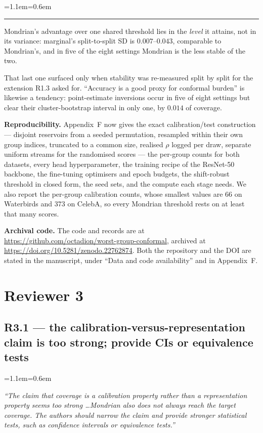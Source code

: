 \documentclass[11pt,a4paper]{article}
\newenvironment{reviewer}
  {\begin{list}{}{\leftmargin=1.1em\rightmargin=0.6em}\item[]\itshape\color{revgrey}\small}
  {\end{list}}
\newenvironment{revised}
  {\begin{list}{}{\leftmargin=1.1em\rightmargin=0.6em}\item[]%
   \color{black}\small\hspace{-1.1em}\textcolor{quoterule}{\rule[-0.4ex]{2pt}{1.05em}}\hspace{0.5em}\ignorespaces}
  {\end{list}}
\newcommand{\rpoint}[2]{\subsection*{#1 --- #2}}
\begin{document}
\begin{revised}
Mondrian's advantage over one shared threshold lies in the \emph{level} it attains, not
in its variance: marginal's split-to-split SD is $0.007$--$0.043$, comparable to Mondrian's, and in
five of the eight settings Mondrian is the less stable of the two.
\end{revised}

That last one surfaced only when stability was re-measured split by split for the extension R1.3
asked for. ``Accuracy is a good proxy for conformal burden'' is
likewise a tendency: point-estimate inversions occur in five of eight settings but clear their
cluster-bootstrap interval in only one, by $0.014$ of coverage.

\textbf{Reproducibility.} Appendix~F now gives the exact calibration/test construction --- disjoint
reservoirs from a seeded permutation, resampled within their own group indices, truncated to a
common size, realised $\rho$ logged per draw, separate uniform streams for the randomised scores ---
the per-group counts for both datasets, every head hyperparameter, the training recipe of the
ResNet-50 backbone, the fine-tuning optimisers and epoch budgets, the shift-robust threshold in
closed form, the seed sets, and the compute each stage needs. We
also report the per-group calibration counts, whose smallest values are $66$ on Waterbirds and
$373$ on CelebA, so every Mondrian threshold rests on at least that many scores.

\textbf{Archival code.} The code and records are at
\url{https://github.com/octadion/worst-group-conformal}, archived at
\url{https://doi.org/10.5281/zenodo.22762874}. Both the repository and the DOI are stated in
the manuscript, under ``Data and code availability'' and in Appendix~F.

\section*{Reviewer 3}

\rpoint{R3.1}{the calibration-versus-representation claim is too strong; provide CIs or equivalence
tests}

\begin{reviewer}
``The claim that coverage is a calibration property rather than a representation property seems too
strong \ldots Mondrian also does not always reach the target coverage. The authors should narrow the
claim and provide stronger statistical tests, such as confidence intervals or equivalence tests.''
\end{reviewer}
\end{document}

